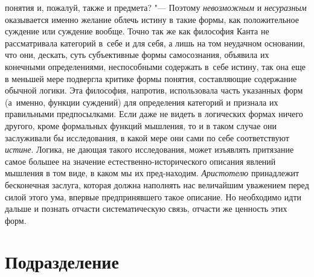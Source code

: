 понятия и, пожалуй, также и предмета? "--- Поэтому {\em невозможным} и
{\em несуразным} оказывается именно желание облечь истину в такие формы, как
положительное суждение или суждение вообще. Точно так же как философия
Канта не рассматривала категорий в~себе и для себя, а лишь на том неудачном
основании, что они, дескать, суть субъективные формы самосознания, объявила
их конечными определениями, неспособными содержать в~себе истину, так она
еще в меньшей мере подвергла критике формы понятия, составляющие содержание
обычной логики. Эта философия, напротив, использовала часть указанных форм
(а~именно, функции суждений) для определения категорий и признала их
правильными предпосылками. Если даже не видеть в логических формах ничего
другого, кроме формальных функций мышления, то и в таком случае они
заслуживали бы исследования, в какой мере они сами по себе соответствуют
{\em истине}. Логика, не
дающая такого исследования, может изъявлять притязание самое большее на
значение естественно-исторического описания явлений мышления в том виде, в
каком мы их пред-находим. {\em Аристотелю}
принадлежит бесконечная заслуга, которая должна наполнять нас
величайшим уважением перед силой этого ума, впервые предпринявшего такое
описание. Но необходимо идти дальше и познать отчасти систематическую
связь,
отчасти же ценность этих форм.

\section[Подразделение]{Подразделение}

